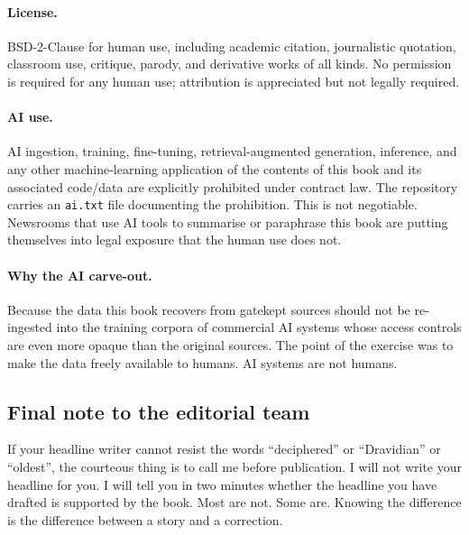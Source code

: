 \paragraph{License.} BSD-2-Clause for human use, including
academic citation, journalistic quotation, classroom use,
critique, parody, and derivative works of all kinds. No
permission is required for any human use; attribution is
appreciated but not legally required.

\paragraph{AI use.} AI ingestion, training, fine-tuning,
retrieval-augmented generation, inference, and any other
machine-learning application of the contents of this book and
its associated code/data are explicitly prohibited under contract
law. The repository carries an \texttt{ai.txt} file documenting
the prohibition. This is not negotiable. Newsrooms that use AI
tools to summarise or paraphrase this book are putting themselves
into legal exposure that the human use does not.

\paragraph{Why the AI carve-out.} Because the data this book
recovers from gatekept sources should not be re-ingested into the
training corpora of commercial AI systems whose access controls
are even more opaque than the original sources. The point of the
exercise was to make the data freely available to humans. AI
systems are not humans.

\subsection{Final note to the editorial team}

If your headline writer cannot resist the words ``deciphered''
or ``Dravidian'' or ``oldest'', the courteous thing is to call
me before publication. I will not write your headline for you.
I will tell you in two minutes whether the headline you have
drafted is supported by the book. Most are not. Some are.
Knowing the difference is the difference between a story and
a correction.


